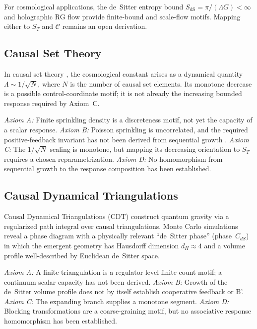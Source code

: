 \documentclass[aps,prd,twocolumn,superscriptaddress,nofootinbib]{revtex4-2}
\begin{document}
For cosmological applications, the de~Sitter entropy bound $S_{\mathrm{dS}} = \pi/(\Lambda G) < \infty$ and holographic RG flow \cite{deBoer2000} provide finite-bound and scale-flow motifs. Mapping either to $S_T$ and $\mathcal C$ remains an open derivation.

\subsection{Causal Set Theory}

In causal set theory \cite{Sorkin2003,Surya2019}, the cosmological constant arises as a dynamical quantity $\Lambda \sim 1/\sqrt{N}$, where $N$ is the number of causal set elements. Its monotone decrease is a possible control-coordinate motif; it is not already the increasing bounded response required by Axiom~C.

\textit{Axiom A:} Finite sprinkling density is a discreteness motif, not yet the capacity of a scalar response. \textit{Axiom B:} Poisson sprinkling is uncorrelated, and the required positive-feedback invariant has not been derived from sequential growth \cite{Surya2019}. \textit{Axiom C:} The $1/\sqrt{N}$ scaling is monotone, but mapping its decreasing orientation to $S_T$ requires a chosen reparametrization. \textit{Axiom D:} No homomorphism from sequential growth to the response composition has been established.

\subsection{Causal Dynamical Triangulations}

Causal Dynamical Triangulations (CDT) \cite{Ambjorn2005,Loll2020} construct quantum gravity via a regularized path integral over causal triangulations. Monte Carlo simulations reveal a phase diagram with a physically relevant ``de~Sitter phase'' (phase~$C_{dS}$) in which the emergent geometry has Hausdorff dimension $d_H \approx 4$ and a volume profile well-described by Euclidean de~Sitter space.

\textit{Axiom A:} A finite triangulation is a regulator-level finite-count motif; a continuum scalar capacity has not been derived. \textit{Axiom B:} Growth of the de~Sitter volume profile does not by itself establish cooperative feedback or B'. \textit{Axiom C:} The expanding branch supplies a monotone segment. \textit{Axiom D:} Blocking transformations are a coarse-graining motif, but no associative response homomorphism has been established.
\end{document}
